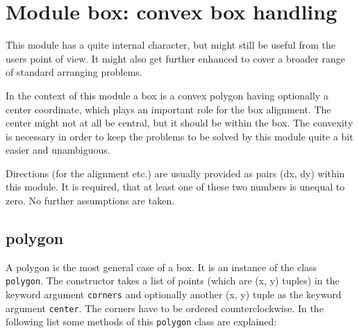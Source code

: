 \chapter{Module box: convex box handling}
\label{module:box}

This module has a quite internal character, but might still be useful
from the users point of view. It might also get further enhanced to
cover a broader range of standard arranging problems.

In the context of this module a box is a convex polygon having
optionally a center coordinate, which plays an important role for the
box alignment. The center might not at all be central, but it should
be within the box. The convexity is necessary in order to keep the
problems to be solved by this module quite a bit easier and
unambiguous.

Directions (for the alignment etc.) are usually provided as pairs
(dx, dy) within this module. It is required, that at least one of
these two numbers is unequal to zero. No further assumptions are taken.

\section{polygon}

A polygon is the most general case of a box. It is an instance of the
class \verb|polygon|. The constructor takes a list of points (which
are (x, y) tuples) in the keyword argument \verb|corners| and
optionally another (x, y) tuple as the keyword argument \verb|center|.
The corners have to be ordered counterclockwise. In the following list
some methods of this \verb|polygon| class are explained:

